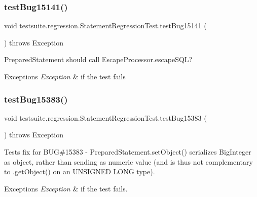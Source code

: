 \subsubsection{\texorpdfstring{test\+Bug15141()}{testBug15141()}}
{\footnotesize\ttfamily void testsuite.\+regression.\+Statement\+Regression\+Test.\+test\+Bug15141 (\begin{DoxyParamCaption}{ }\end{DoxyParamCaption}) throws Exception}

Prepared\+Statement should call Escape\+Processor.\+escape\+S\+QL?


\begin{DoxyExceptions}{Exceptions}
{\em Exception} & if the test fails \\
\hline
\end{DoxyExceptions}
\mbox{\label{classtestsuite_1_1regression_1_1_statement_regression_test_a8077d99b51217d8479e3637eac582d17}} 
\subsubsection{\texorpdfstring{test\+Bug15383()}{testBug15383()}}
{\footnotesize\ttfamily void testsuite.\+regression.\+Statement\+Regression\+Test.\+test\+Bug15383 (\begin{DoxyParamCaption}{ }\end{DoxyParamCaption}) throws Exception}

Tests fix for B\+UG\#15383 -\/ Prepared\+Statement.\+set\+Object() serializes Big\+Integer as object, rather than sending as numeric value (and is thus not complementary to .get\+Object() on an U\+N\+S\+I\+G\+N\+ED L\+O\+NG type).


\begin{DoxyExceptions}{Exceptions}
{\em Exception} & if the test fails. \\
\hline
\end{DoxyExceptions}
\mbox{\label{classtestsuite_1_1regression_1_1_statement_regression_test_af66916471e845ecaf25d5a2e0e3b67eb}} 
